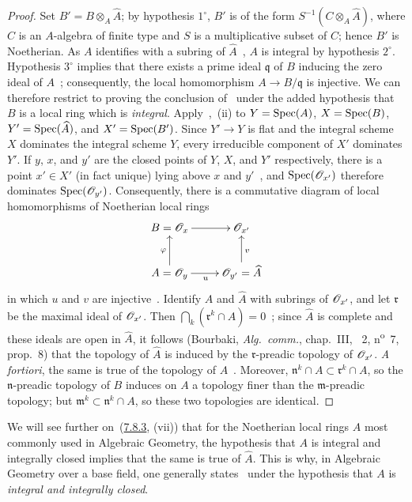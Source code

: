 \begin{proof}
Set $B'=B\otimes_A\widehat{A}$; by hypothesis $1^\circ$, $B'$ is of the form $S^{-1}(C\otimes_A\widehat{A})$, where $C$ is an $A$-algebra of finite type and $S$ is a multiplicative subset of $C$; hence $B'$ is Noetherian.
As $A$ identifies with a subring of $\widehat{A}$~, $A$ is integral by hypothesis $2^\circ$.
Hypothesis $3^\circ$ implies that there exists a prime ideal $\mathfrak{q}$ of $B$ inducing the zero ideal of $A$~; consequently, the local homomorphism $A\to B/\mathfrak{q}$ is injective.
We can therefore restrict to proving the conclusion of~ under the added hypothesis that $B$ is a local ring which is \emph{integral}.
Apply~,~(ii) to $Y=\operatorname{Spec}(A)$, $X=\operatorname{Spec}(B)$, $Y'=\operatorname{Spec}(\widehat{A})$, and $X'=\operatorname{Spec}(B')$.
Since $Y'\to Y$ is flat and the integral scheme $X$ dominates the integral scheme $Y$, every irreducible component of $X'$ dominates $Y'$.
If $y$, $x$, and $y'$ are the closed points of $Y$, $X$, and $Y'$ respectively, there is a point $x'\in X'$ (in fact unique) lying above $x$ and $y'$~, and $\operatorname{Spec}(\mathscr{O}_{x'})$ therefore dominates $\operatorname{Spec}(\mathscr{O}_{y'})$.
Consequently, there is a commutative diagram of local homomorphisms of Noetherian local rings
\[
\xymatrix{
  B=\sh{O}_x \ar[r] & \sh{O}_{x'}\\
  A=\sh{O}_y \ar[u]^{\varphi} \ar[r]_{u} & \sh{O}_{y'}=\widehat{A} \ar[u]_{v}
}
\]
in which $u$ and $v$ are injective~.
Identify $A$ and $\widehat{A}$ with subrings of $\mathscr{O}_{x'}$, and let $\mathfrak{r}$ be the maximal ideal of $\mathscr{O}_{x'}$.
Then $\bigcap_k(\mathfrak{r}^k\cap\widehat{A})=0$~; since $\widehat{A}$ is complete and these ideals are open in $\widehat{A}$, it follows (Bourbaki, \emph{Alg.~comm.}, chap.~III, \textsection~2, n\textsuperscript{o}~7, prop.~8) that the topology of $\widehat{A}$ is induced by the $\mathfrak{r}$-preadic topology of $\mathscr{O}_{x'}$.
\emph{A fortiori}, the same is true of the topology of $A$~.
Moreover, $\mathfrak{n}^k\cap A\subset\mathfrak{r}^k\cap A$, so the $\mathfrak{n}$-preadic topology of $B$ induces on $A$ a topology finer than the $\mathfrak{m}$-preadic topology; but $\mathfrak{m}^k\subset\mathfrak{n}^k\cap A$, so these two topologies are identical.
\end{proof}

\begin{remark}[2.3.9]
\label{IV.2.3.9}
We will see further on~({\hyperref[IV.7.8.3]{7.8.3}}, (vii)) that for the Noetherian local rings $A$ most commonly used in Algebraic Geometry, the hypothesis that $A$ is integral and integrally closed implies that the same is true of $\widehat{A}$.
This is why, in Algebraic Geometry over a base field, one generally states~ under the hypothesis that $A$ is \emph{integral and integrally closed}.
\end{remark}

